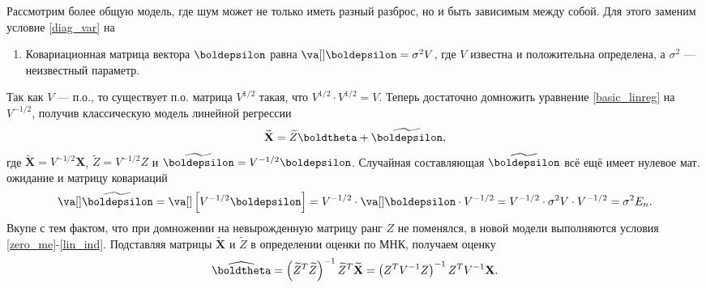 Рассмотрим более общую модель, где шум может не только иметь разный разброс, но и быть зависимым между собой. Для этого заменим условие \ref{diag_var} на
\begin{enumerate}[label=\textbf{L\arabic*'}]
    \addtocounter{enumi}{1}
    \item\label{l2} Ковариационная матрица вектора $\boldepsilon$ равна $\va[] \boldepsilon = \sigma^2 V$, где $V$ известна и положительна определена, а $\sigma^2$ --- неизвестный параметр.
\end{enumerate}

Так как $V$ --- п.о., то существует п.о. матрица $V^{1/2}$ такая, что $V^{1/2} \cdot V^{1/2} = V$. Теперь достаточно домножить уравнение \eqref{basic_linreg} на $V^{-1/2}$, получив классическую модель линейной регрессии
\[
\widetilde{\mathbf X} = \widetilde{Z} \boldtheta + \widetilde{\boldepsilon},
\]
где $\widetilde{\mathbf X} = V^{-1/2}\mathbf X$, $\widetilde{Z} = V^{-1/2}Z$ и $\widetilde{\boldepsilon} = V^{-1/2}\boldepsilon$. Случайная составляющая $\widetilde{\boldepsilon}$ всё ещё имеет нулевое мат. ожидание и матрицу ковариаций
\[
\va[]\widetilde{\boldepsilon} = \va[]\left[V^{-1/2}\boldepsilon\right] = V^{-1/2} \cdot \va[]\boldepsilon \cdot V^{-1/2} = V^{-1/2} \cdot \sigma^2 V \cdot V^{-1/2} = \sigma^2E_n.
\]
Вкупе с тем фактом, что при домножении на невырожденную матрицу ранг $Z$ не поменялся, в новой модели выполняются условия \ref{zero_me}-\ref{lin_ind}. Подставляя матрицы $\widetilde{\mathbf X}$ и $\widetilde{Z}$ в определении оценки по МНК, получаем оценку
\begin{equation}\label{weighted_mnk_formula}
    \widehat{\boldtheta} = \left(\widetilde{Z}^T \widetilde{Z}\right)^{-1}\widetilde{Z}^T\widetilde{\mathbf X} = \left(Z^T V^{-1} Z\right)^{-1}Z^T V^{-1} \mathbf X.
\end{equation}
